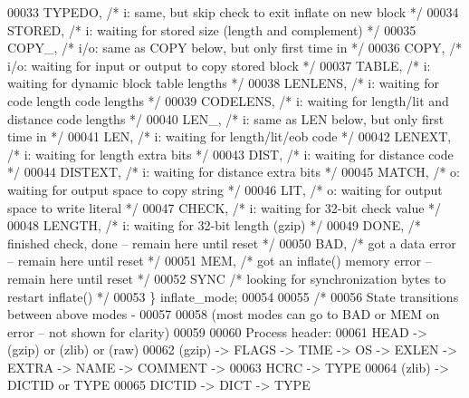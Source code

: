 \begin{DoxyCode}
00033         TYPEDO,     \textcolor{comment}{/* i: same, but skip check to exit inflate on new block */}
00034         STORED,     \textcolor{comment}{/* i: waiting for stored size (length and complement) */}
00035         COPY\_,      \textcolor{comment}{/* i/o: same as COPY below, but only first time in */}
00036         COPY,       \textcolor{comment}{/* i/o: waiting for input or output to copy stored block */}
00037         TABLE,      \textcolor{comment}{/* i: waiting for dynamic block table lengths */}
00038         LENLENS,    \textcolor{comment}{/* i: waiting for code length code lengths */}
00039         CODELENS,   \textcolor{comment}{/* i: waiting for length/lit and distance code lengths */}
00040             LEN\_,       \textcolor{comment}{/* i: same as LEN below, but only first time in */}
00041             LEN,        \textcolor{comment}{/* i: waiting for length/lit/eob code */}
00042             LENEXT,     \textcolor{comment}{/* i: waiting for length extra bits */}
00043             DIST,       \textcolor{comment}{/* i: waiting for distance code */}
00044             DISTEXT,    \textcolor{comment}{/* i: waiting for distance extra bits */}
00045             MATCH,      \textcolor{comment}{/* o: waiting for output space to copy string */}
00046             LIT,        \textcolor{comment}{/* o: waiting for output space to write literal */}
00047     CHECK,      \textcolor{comment}{/* i: waiting for 32-bit check value */}
00048     LENGTH,     \textcolor{comment}{/* i: waiting for 32-bit length (gzip) */}
00049     DONE,       \textcolor{comment}{/* finished check, done -- remain here until reset */}
00050     BAD,        \textcolor{comment}{/* got a data error -- remain here until reset */}
00051     MEM,        \textcolor{comment}{/* got an inflate() memory error -- remain here until reset */}
00052     SYNC        \textcolor{comment}{/* looking for synchronization bytes to restart inflate() */}
00053 \} inflate\_mode;
00054 
00055 \textcolor{comment}{/*}
00056 \textcolor{comment}{    State transitions between above modes -}
00057 \textcolor{comment}{}
00058 \textcolor{comment}{    (most modes can go to BAD or MEM on error -- not shown for clarity)}
00059 \textcolor{comment}{}
00060 \textcolor{comment}{    Process header:}
00061 \textcolor{comment}{        HEAD -> (gzip) or (zlib) or (raw)}
00062 \textcolor{comment}{        (gzip) -> FLAGS -> TIME -> OS -> EXLEN -> EXTRA -> NAME -> COMMENT ->}
00063 \textcolor{comment}{                  HCRC -> TYPE}
00064 \textcolor{comment}{        (zlib) -> DICTID or TYPE}
00065 \textcolor{comment}{        DICTID -> DICT -> TYPE}

\end{DoxyCode}
